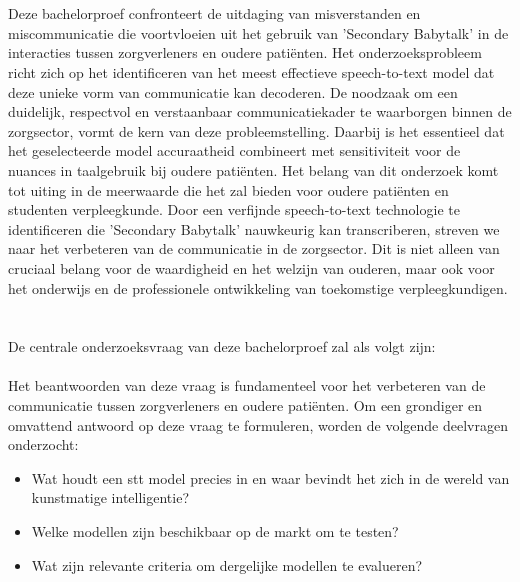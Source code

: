 \section{}%
\label{sec:probleemstelling}
Deze bachelorproef confronteert de uitdaging van misverstanden en miscommunicatie die voortvloeien uit het gebruik van 'Secondary Babytalk' in de interacties tussen zorgverleners en oudere patiënten. Het onderzoeksprobleem richt zich op het identificeren van het meest effectieve speech-to-text model dat deze unieke vorm van communicatie kan decoderen. De noodzaak om een duidelijk, respectvol en verstaanbaar communicatiekader te waarborgen binnen de zorgsector, vormt de kern van deze probleemstelling. Daarbij is het essentieel dat het geselecteerde model accuraatheid combineert met sensitiviteit voor de nuances in taalgebruik bij oudere patiënten.
Het belang van dit onderzoek komt tot uiting in de meerwaarde die het zal bieden voor oudere patiënten en studenten verpleegkunde. Door een verfijnde speech-to-text technologie te identificeren die 'Secondary Babytalk' nauwkeurig kan transcriberen, streven we naar het verbeteren van de communicatie in de zorgsector. Dit is niet alleen van cruciaal belang voor de waardigheid en het welzijn van ouderen, maar ook voor het onderwijs en de professionele ontwikkeling van toekomstige verpleegkundigen.



\section{}%
\label{sec:onderzoeksvraag}

De centrale onderzoeksvraag van deze bachelorproef zal als volgt zijn:\\


\\
\break
Het beantwoorden van deze vraag is fundamenteel voor het verbeteren van de communicatie tussen zorgverleners en oudere patiënten. Om een grondiger en omvattend antwoord op deze vraag te formuleren, worden de volgende deelvragen onderzocht:

\begin{itemize}
    \item Wat houdt een \gls{stt} model precies in en waar bevindt het zich in de wereld van kunstmatige intelligentie?
    \item Welke modellen zijn beschikbaar op de markt om te testen?
    \item Wat zijn relevante criteria om dergelijke modellen te evalueren?
\end{itemize}
